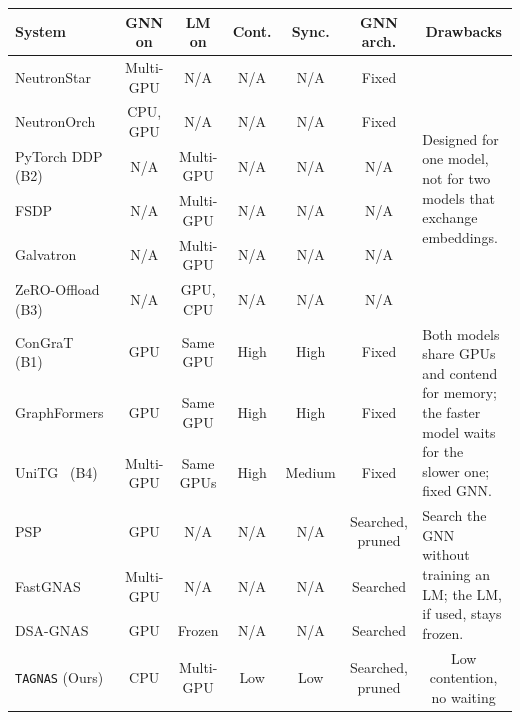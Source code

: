 \begin{tabular}{l|c|c|c|c|c|p{4.9cm}}
\hline
\textbf{System} & \textbf{GNN on} & \textbf{LM on} & \textbf{Cont.} & \textbf{Sync.} & \textbf{GNN arch.} & \multicolumn{1}{c}{\textbf{Drawbacks}}\\
\hline
NeutronStar~\cite{neutronstar} & Multi-GPU & N/A & N/A & N/A & Fixed & \multirow{6}{=}{Designed for one model, not for two models that exchange embeddings.}\\
NeutronOrch~\cite{neutronorch} & CPU, GPU & N/A & N/A & N/A & Fixed & \\
PyTorch DDP~\cite{ddp} (B2) & N/A & Multi-GPU & N/A & N/A & N/A & \\
FSDP~\cite{fsdp} & N/A & Multi-GPU & N/A & N/A & N/A & \\
Galvatron~\cite{galvatron} & N/A & Multi-GPU & N/A & N/A & N/A & \\
ZeRO-Offload~\cite{zero} (B3) & N/A & GPU, CPU & N/A & N/A & N/A & \\
\hline
ConGraT~\cite{congrat} (B1) & GPU & Same GPU & High & High & Fixed & \multirow{3}{=}{Both models share GPUs and contend for memory; the faster model waits for the slower one; fixed GNN.}\\
GraphFormers~\cite{graphformers} & GPU & Same GPU & High & High & Fixed & \\
UniTG~\cite{unitg} (B4) & Multi-GPU & Same GPUs & High & Medium & Fixed & \\
\hline
PSP~\cite{psp} & GPU & N/A & N/A & N/A & Searched, pruned & \multirow{3}{=}{Search the GNN without training an LM; the LM, if used, stays frozen.}\\
FastGNAS~\cite{fastgnas} & Multi-GPU & N/A & N/A & N/A & Searched & \\
DSA-GNAS~\cite{dsagnas} & GPU & Frozen & N/A & N/A & Searched & \\
\hline
\texttt{TAGNAS} (Ours) & CPU & Multi-GPU & Low & Low & Searched, pruned & \multicolumn{1}{c}{Low contention, no waiting}\\
\hline
\end{tabular}
